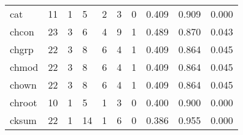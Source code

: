 \begin{longtable}{lp{1.3cm}p{1.3cm}p{1.3cm}p{1.3cm}p{1.3cm}p{1.3cm}p{1.3cm}p{1.3cm}p{1.3cm}}
cat       &                     11 &                                             1 &                                            5 &                                           2 &                                            3 &                                          0 &                                0.409 &                                  0.909 &                                0.000 \\
chcon     &                     23 &                                             3 &                                            6 &                                           4 &                                            9 &                                          1 &                                0.489 &                                  0.870 &                                0.043 \\
chgrp     &                     22 &                                             3 &                                            8 &                                           6 &                                            4 &                                          1 &                                0.409 &                                  0.864 &                                0.045 \\
chmod     &                     22 &                                             3 &                                            8 &                                           6 &                                            4 &                                          1 &                                0.409 &                                  0.864 &                                0.045 \\
chown     &                     22 &                                             3 &                                            8 &                                           6 &                                            4 &                                          1 &                                0.409 &                                  0.864 &                                0.045 \\
chroot    &                     10 &                                             1 &                                            5 &                                           1 &                                            3 &                                          0 &                                0.400 &                                  0.900 &                                0.000 \\
cksum     &                     22 &                                             1 &                                           14 &                                           1 &                                            6 &                                          0 &                                0.386 &                                  0.955 &                                0.000 \\

\end{longtable}
